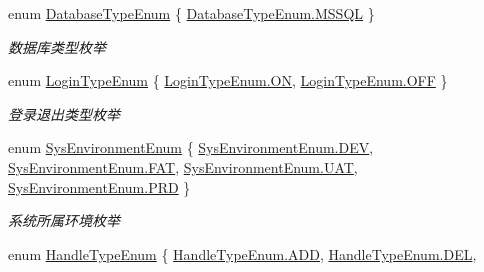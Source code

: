 \begin{DoxyCompactItemize}
\item 
enum \hyperlink{class_x_c_l_net_tools_1_1_enum_1_1_common_enum_a4c4edc085935542b75e6386cb261ab4b}{Database\+Type\+Enum} \{ \hyperlink{class_x_c_l_net_tools_1_1_enum_1_1_common_enum_a4c4edc085935542b75e6386cb261ab4ba1d37e2cfa8532be01d3f89c76ccfe4a9}{Database\+Type\+Enum.\+M\+S\+S\+QL}
 \}\begin{DoxyCompactList}\small\item\em 数据库类型枚举 \end{DoxyCompactList}
\item 
enum \hyperlink{class_x_c_l_net_tools_1_1_enum_1_1_common_enum_a2d2cb4aef1c5cbc23f73c25b5f0c2948}{Login\+Type\+Enum} \{ \hyperlink{class_x_c_l_net_tools_1_1_enum_1_1_common_enum_a2d2cb4aef1c5cbc23f73c25b5f0c2948a90651ebea9a35ec4e018c8157492e17c}{Login\+Type\+Enum.\+ON}, 
\hyperlink{class_x_c_l_net_tools_1_1_enum_1_1_common_enum_a2d2cb4aef1c5cbc23f73c25b5f0c2948a88559a0cfd8250c9d65970cc145c92d4}{Login\+Type\+Enum.\+O\+FF}
 \}\begin{DoxyCompactList}\small\item\em 登录退出类型枚举 \end{DoxyCompactList}
\item 
enum \hyperlink{class_x_c_l_net_tools_1_1_enum_1_1_common_enum_a2dff7451b041ff407645f3b3d719e3e2}{Sys\+Environment\+Enum} \{ \hyperlink{class_x_c_l_net_tools_1_1_enum_1_1_common_enum_a2dff7451b041ff407645f3b3d719e3e2abfeddf560ff988c07141df6135a9bfcf}{Sys\+Environment\+Enum.\+D\+EV}, 
\hyperlink{class_x_c_l_net_tools_1_1_enum_1_1_common_enum_a2dff7451b041ff407645f3b3d719e3e2a06161379527b8df6b18fca5aa984113a}{Sys\+Environment\+Enum.\+F\+AT}, 
\hyperlink{class_x_c_l_net_tools_1_1_enum_1_1_common_enum_a2dff7451b041ff407645f3b3d719e3e2a19dd6c1cec504ac854645f352eb03209}{Sys\+Environment\+Enum.\+U\+AT}, 
\hyperlink{class_x_c_l_net_tools_1_1_enum_1_1_common_enum_a2dff7451b041ff407645f3b3d719e3e2ae6902e951e9f7d122ca93383ded67ff3}{Sys\+Environment\+Enum.\+P\+RD}
 \}\begin{DoxyCompactList}\small\item\em 系统所属环境枚举 \end{DoxyCompactList}
\item 
enum \hyperlink{class_x_c_l_net_tools_1_1_enum_1_1_common_enum_af5501e481d93b082864bdcfb5fdb9596}{Handle\+Type\+Enum} \{ \newline
\hyperlink{class_x_c_l_net_tools_1_1_enum_1_1_common_enum_af5501e481d93b082864bdcfb5fdb9596a9eeb52badb613229884838847294b90d}{Handle\+Type\+Enum.\+A\+DD}, 
\hyperlink{class_x_c_l_net_tools_1_1_enum_1_1_common_enum_af5501e481d93b082864bdcfb5fdb9596a2bbe23c0e8b3f638f0f5aed4b6864513}{Handle\+Type\+Enum.\+D\+EL}, 

\end{DoxyCompactItemize}
